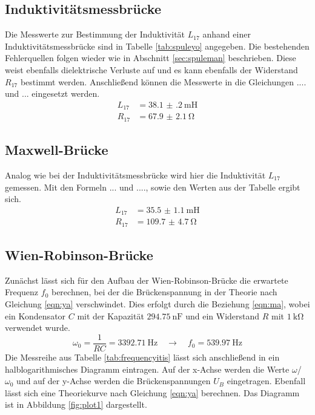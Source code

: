 \subsection{Induktivitätsmessbrücke}
Die Messwerte zur Bestimmung der Induktivität $L_{17}$ anhand einer Induktivitätsmessbrücke sind in Tabelle \ref{tab:spuleyo} angegeben. Die bestehenden Fehlerquellen
folgen wieder wie in Abschnitt \ref{sec:spuleman} beschrieben. Diese weist ebenfalls dielektrische Verluste 
auf und es kann ebenfalls der Widerstand $R_{17}$ bestimmt werden. Anschließend können die Messwerte in die Gleichungen .... und ... eingesetzt werden.
\begin{align}
L_{17} &= \SI{38.1(2)}{\milli\henry} \\
R_{17} &= \SI{67.9(21)}{\ohm} 
\end{align}

\subsection{Maxwell-Brücke}
Analog wie bei der Induktivitätsmessbrücke wird hier die Induktivität $L_{17}$ gemessen. Mit den Formeln ... und ...., sowie den Werten aus der Tabelle ergibt sich.
\begin{align}
    L_{17} &= \SI{35.5(11)}{\milli\henry} \\
    R_{17} &= \SI{109.7(47)}{\ohm} 
\end{align}

\subsection{Wien-Robinson-Brücke}
Zunächst lässt sich für den Aufbau der Wien-Robinson-Brücke die erwartete Frequenz $f_{0}$ berechnen, bei der die Brückenspannung in der Theorie nach Gleichung \eqref{eqn:ya}
verschwindet. Dies erfolgt durch die Beziehung \eqref{eqn:ma}, wobei ein Kondensator $C$ mit der Kapazität $\SI{294.75}{\nano\farad}$ und ein Widerstand $R$ mit $\SI{1}{\kilo\ohm}$ verwendet wurde.
\begin{equation}
\omega_{0} = \frac{1}{RC} = \SI{3392.71}{\hertz}  \quad \to \quad f_{0} = \SI{539.97}{\hertz}
\end{equation}
Die Messreihe aus Tabelle \ref{tab:frequencyitis} lässt sich anschließend in ein halblogarithmisches Diagramm eintragen. Auf der x-Achse werden die Werte $\omega$/$\omega_{0}$ und auf der y-Achse werden die Brückenspannungen $U_{B}$ eingetragen. 
Ebenfall lässt sich eine Theoriekurve nach Gleichung \eqref{eqn:ya} berechnen. Das Diagramm ist in Abbildung \ref{fig:plot1} dargestellt.

